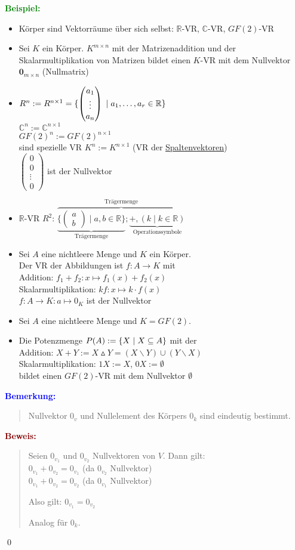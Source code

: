 \documentclass{article}
\newcommand{\smsp}{\phantom{\hspace{3px}}}
\newcommand{\mesp}{\phantom{\hspace{10px}}}
\newcommand{\blue}[1]{\textcolor{blue}{#1}}
\newcommand{\green}[1]{\textcolor{green}{#1}}
\newcommand{\maroon}[1]{\textcolor{maroon}{#1}}
\newcommand{\ex}{\green{\textbf{Beispiel: }}}
\newcommand{\an}[1]{\blue{\textbf{Bemerkung: }}\begin{quote}#1\end{quote}}
\newcommand{\pr}[1]{\maroon{\textbf{Beweis: }}\begin{quote}#1\end{quote}\qed}
\newcommand{\R}{\mathbb{R}}
\newcommand{\C}{\mathbb{C}}
\renewcommand{\st}{\smsp | \smsp}
\newcommand{\xor}{\mathbin{\vartriangle}}
\newcommand{\vvec}[2]{\begin{pmatrix}#1\\#2\end{pmatrix}}
\newcommand{\vvvec}[3]{\begin{pmatrix}#1\\#2\\#3\end{pmatrix}}
\begin{document}
\ex \begin{itemize}
    \item Körper sind Vektorräume über sich selbst: $\R$-VR, $\C$-VR, $GF(2)$-VR
    \item Sei $K$ ein Körper. $K^{m \times n}$ mit der Matrizenaddition und der Skalarmultiplikation von Matrizen bildet einen $K$-VR mit dem Nullvektor $\mathbf{0}_{m \times n}$ (Nullmatrix)
    \item $R^n := R^{n \times 1} = \{\vvvec{a_1}{\vdots}{a_n} \st a_1,\dots,a_r \in \R\}$\\
    $\C^n := \C^{n \times 1}$\\
    $GF(2)^n := GF(2)^{n \times 1}$\\
    sind spezielle VR $K^n := K^{n \times 1}$ (VR der \underline{Spaltenvektoren})\\
    $\begin{pmatrix}
        0\\
        0\\
        \vdots\\
        0
    \end{pmatrix}$ ist der Nullvektor
    \item $\R$-VR $R^2$: $\overbrace{\underbrace{\{\vvec{a}{b} \mid a,b \in \R\}}_{\text{Trägermenge}}; \underbrace{+, (k \mid k \in \R)}_{\text{Operationssymbole}}}^{\text{Trägermenge}}$
    \item Sei $A$ eine nichtleere Menge und $K$ ein Körper.\\
    Der VR der Abbildungen ist $f: A \to K$ mit\\
    \mesp Addition: $f_1 + f_2: x \mapsto f_1(x) + f_2(x)$\\
    \mesp Skalarmultiplikation: $kf: x \mapsto k \cdot f(x)$\\
    $f: A \to K: a \mapsto 0_K$ ist der Nullvektor
    \item Sei $A$ eine nichtleere Menge und $K = GF(2)$.
    \item Die Potenzmenge $P(A) := \{X \st X \subseteq A\}$ mit der\\
    \mesp Addition: $X + Y := X \xor Y = (X \backslash Y) \cup (Y \backslash X)$\\
    \mesp Skalarmultiplikation: $1X := X$, $0X := \emptyset$\\
    bildet einen $GF(2)$-VR mit dem Nullvektor $\emptyset$
\end{itemize}

\an{
    Nullvektor $0_v$ und Nullelement des Körpers $0_k$ sind eindeutig bestimmt.
}
\pr{
    Seien $0_{v_1}$ und $0_{v_2}$ Nullvektoren von $V$.
    Dann gilt:\\
    \mesp $0_{v_1} + 0_{v_2} = 0_{v_1}$ (da $0_{v_2}$ Nullvektor)\\ 
    \mesp $0_{v_1} + 0_{v_2} = 0_{v_2}$ (da $0_{v_1}$ Nullvektor)

    Also gilt: $0_{v_1} = 0_{v_2}$

    Analog für $0_k$.
}
\end{document}
